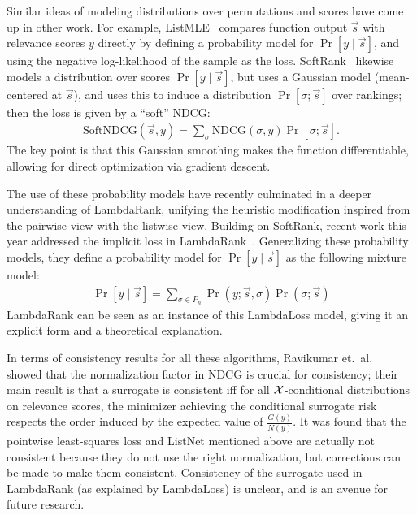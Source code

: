 Similar ideas of modeling distributions over permutations and scores 
have come up in other work. For example, ListMLE~\cite{xia2008listwise}
compares function output $\vec{s}$ with relevance scores $y$ directly
by defining a probability model for $\Pr[y \mid \vec{s}]$, and using the
negative log-likelihood of the sample as the loss.
SoftRank~\cite{taylor2008softrank} likewise models a distribution over scores
$\Pr[y \mid \vec{s}]$, but uses a Gaussian model (mean-centered at $\vec{s}$),
and uses this to induce a distribution $\Pr[\sigma ; \vec{s}]$ over rankings;
then the loss is given by a ``soft'' NDCG:
\begin{align*}
  \text{SoftNDCG}(\vec{s}, y) = \sum_{\sigma} \text{NDCG}(\sigma, y) \Pr[\sigma ; \vec{s}].
\end{align*}
The key point is that this Gaussian smoothing makes the function differentiable,
allowing for direct optimization via gradient descent.

The use of these probability models have recently culminated in a deeper understanding
of LambdaRank, unifying the heuristic modification inspired from the
pairwise view with the listwise view.
Building on SoftRank, recent work this year addressed the implicit loss in
LambdaRank~\cite{wang2018lambdaloss}.
Generalizing these probability models, they define a probability model
for $\Pr[y \mid \vec{s}]$ as the following mixture model:
\begin{align*}
  \Pr[y \mid \vec{s}] = \sum_{\sigma \in P_n} \Pr(y ; \vec{s}, \sigma) \Pr(\sigma ; \vec{s})
\end{align*}
LambdaRank can be seen as an instance of this LambdaLoss model,
giving it an explicit form and a theoretical explanation. 


In terms of consistency results for all these algorithms, Ravikumar
et.\ al.~\cite{ravikumar2011ndcg} showed that the normalization factor
in NDCG is crucial for consistency; their main result is that a surrogate is
consistent iff for all ${\mathcal X}$-conditional distributions on relevance scores,
the minimizer achieving the conditional surrogate risk
respects the order induced by the expected value of $\frac{G(y)}{N(y)}$.
It was found that the pointwise least-squares loss and ListNet mentioned above
are actually not consistent because they do not use the right normalization, but
corrections can be made to make them consistent.
Consistency of the surrogate used in LambdaRank (as explained by LambdaLoss)
is unclear, and is an avenue for future research.
